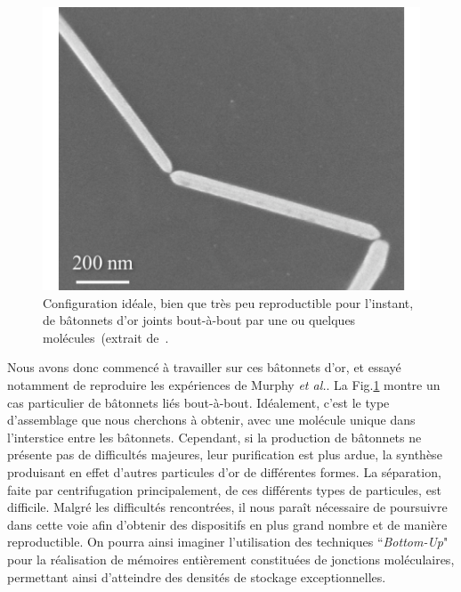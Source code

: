 \begin{figure}[h!]
\parbox{7cm}{
\includegraphics[scale=0.45]{Conclusion/BottomUp/BottomUp.pdf} 
}
\parbox{6.5cm}{\caption{Configuration idéale, bien que très peu reproductible pour l'instant,
de bâtonnets d'or joints bout-à-bout par une ou quelques molécules~(extrait de~\cite{Liatard2012}.}
\label{BottomUpConclu}
}
\end{figure}

Nous avons donc commencé à travailler sur ces bâtonnets d'or, et essayé notamment de reproduire les expériences de Murphy \textit{et al.}. La Fig.\ref{BottomUpConclu} montre un cas particulier de bâtonnets liés bout-à-bout. Idéalement, c'est le type d'assemblage que nous cherchons à obtenir, avec une molécule unique dans l'interstice entre les bâtonnets. Cependant, si la production de bâtonnets ne présente pas de difficultés majeures, leur purification est plus ardue, la synthèse produisant en effet d'autres particules d'or de différentes formes. La séparation, faite par centrifugation principalement, de ces différents types de particules, est difficile. Malgré les difficultés rencontrées, il nous paraît nécessaire de poursuivre dans cette voie afin d’obtenir des dispositifs en plus grand nombre et de manière reproductible. On pourra ainsi imaginer l’utilisation des techniques ``\textit{Bottom-Up}" pour la réalisation de mémoires entièrement constituées de jonctions moléculaires, permettant ainsi d’atteindre des densités de stockage exceptionnelles.


